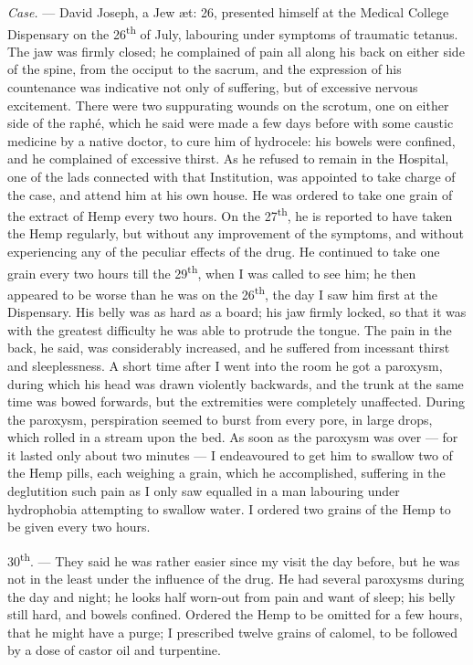 \documentclass[a4paper, 11pt, oneside, polutonikogreek, english]{article}
\begin{document}
\emph{Case.} --- David Joseph, a Jew æt: 26, presented himself at the Medical College Dispensary on the 26\textsuperscript{th} of July, labouring under symptoms of traumatic tetanus. The jaw was firmly closed; he complained of pain all along his back on either side of the spine, from the occiput to the sacrum, and the expression of his countenance was indicative not only of suffering, but of excessive nervous excitement. There were two suppurating wounds on the scrotum, one on either side of the raphé, which he said were made a few days before with some caustic medicine by a native doctor, to cure him of hydrocele: his bowels were confined, and he complained of excessive thirst. As he refused to remain in the Hospital, one of the lads connected with that Institution, was appointed to take charge of the case, and attend him at his own house. He was ordered to take one grain of the extract of Hemp every two hours. On the 27\textsuperscript{th}, he is reported to have taken the Hemp regularly, but without any improvement of the symptoms, and without experiencing any of the peculiar effects of the drug. He continued to take one grain every two hours till the 29\textsuperscript{th}, when I was called to see him; he then appeared to be worse than he was on the 26\textsuperscript{th}, the day I saw him first at the Dispensary. His belly was as hard as a board; his jaw firmly locked, so that it was with the greatest difficulty he was able to protrude the tongue. The pain in the back, he said, was considerably increased, and he suffered from incessant thirst and sleeplessness. A short time after I went into the room he got a paroxysm, during which his head was drawn violently backwards, and the trunk at the same time was bowed forwards, but the extremities were completely unaffected. During the paroxysm, perspiration seemed to burst from every pore, in large drops, which rolled in a stream upon the bed. As soon as the paroxysm was over --- for it lasted only about two minutes --- I endeavoured to get him to swallow two of the Hemp pills, each weighing a grain, which he accomplished, suffering in the deglutition such pain as I only saw equalled in a man labouring under hydrophobia attempting to swallow water. I ordered two grains of the Hemp to be given every two hours.

30\textsuperscript{th}. --- They said he was rather easier since my visit the day before, but he was not in the least under the influence of the drug. He had several paroxysms during the day and night; he looks half worn-out from pain and want of sleep; his belly still hard, and bowels confined. Ordered the Hemp to be omitted for a few hours, that he might have a purge; I prescribed twelve grains of calomel, to be followed by a dose of castor oil and turpentine.
\end{document}
